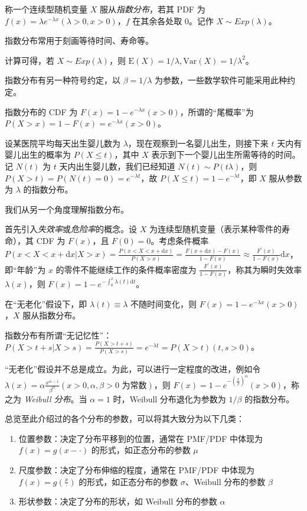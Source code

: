 \documentclass[../main.tex]{subfiles}
\begin{document}
\begin{definition}\label{def:2.5.3}
    称一个连续型随机变量 $X$ 服从\emph{指数分布}，若其 PDF 为 $f(x)=\lambda e^{-\lambda x}(\lambda>0,x>0)$，$f$ 在其余各处取 $0$。记作 $X\sim Exp(\lambda)$。
\end{definition}

指数分布常用于刻画等待时间、寿命等。

计算可得，若 $X\sim Exp(\lambda)$，则 $\mathrm{E}(X)=1/\lambda,\mathrm{Var}(X)=1/\lambda^2$。

指数分布有另一种符号约定，以 $\beta=1/\lambda$ 为参数，一些数学软件可能采用此种约定。

指数分布的 CDF 为 $F(x)=1-e^{-\lambda x}(x>0)$，所谓的“尾概率”为 $P(X>x)=1-F(x)=e^{-\lambda x}(x>0)$。

\begin{example}
    设某医院平均每天出生婴儿数为 $\lambda$，现在观察到一名婴儿出生，则接下来 $t$ 天内有婴儿出生的概率为 $P(X\leq t)$，其中 $X$ 表示到下一个婴儿出生所需等待的时间。\\
    记 $N(t)$ 为 $t$ 天内出生婴儿数，我们已经知道 $N(t)\sim P(t\lambda)$，则 $P(X>t)=P(N(t)=0)=e^{-\lambda t}$，故 $P(X\leq t)=1-e^{-\lambda t}$，即 $X$ 服从参数为 $\lambda$ 的指数分布。
\end{example}

我们从另一个角度理解指数分布。

首先引入\emph{失效率}或\emph{危险率}的概念。设 $X$ 为连续型随机变量（表示某种零件的寿命），其 CDF 为 $F(x)$，且 $F(0)=0$。考虑条件概率 $P(x<X<x+\mathrm{d}x|X>x)=\frac{P(x<X<x+\mathrm{d}x)}{P(X>x)}=\frac{F(x+\mathrm{d}x)-F(x)}{1-F(x)}\approx\frac{F^\prime(x)}{1-F(x)}\mathrm{d}x$，即“年龄”为 $x$ 的零件不能继续工作的条件概率密度为 $\frac{F^\prime(x)}{1-F(x)}$，称其为瞬时失效率 $\lambda(x)$，则 $F(x)=1-e^{-\int_0^x\lambda(t)\mathrm{d}t}$。

在“无老化”假设下，即 $\lambda(t)\equiv \lambda$ 不随时间变化，则 $F(x)=1-e^{-\lambda x}(x>0)$，$X$ 服从指数分布。

指数分布有所谓“无记忆性”：$P(X>t+s|X>s)=\frac{P(X>t+s)}{P(X>s)}=e^{-\lambda t}=P(X>t)(t,s>0)$。

“无老化”假设并不总是成立。为此，可以进行一定程度的改进，例如令 $\lambda(x)=\alpha\frac{x^{\alpha-1}}{\beta^\alpha}(x>0,\alpha,\beta>0\text{ 为常数})$，则 $F(x)=1-e^{-(\frac{x}{\beta})^\alpha}(x>0)$，称之为 \emph{Weibull 分布}。当 $\alpha=1$ 时，Weibull 分布退化为参数为 $1/\beta$ 的指数分布。

总览至此介绍过的各个分布的参数，可以将其大致分为以下几类：
\begin{enumerate}
    \item 位置参数：决定了分布平移到的位置，通常在 PMF/PDF 中体现为 $f(x)=g(x-\cdot)$ 的形式，如正态分布的参数 $\mu$
    \item 尺度参数：决定了分布伸缩的程度，通常在 PMF/PDF 中体现为 $f(x)=g(\frac x\cdot)$ 的形式，如正态分布的参数 $\sigma$、Weibull 分布的参数 $\beta$
    \item 形状参数：决定了分布的形状，如 Weibull 分布的参数 $\alpha$
\end{enumerate}
\end{document}
